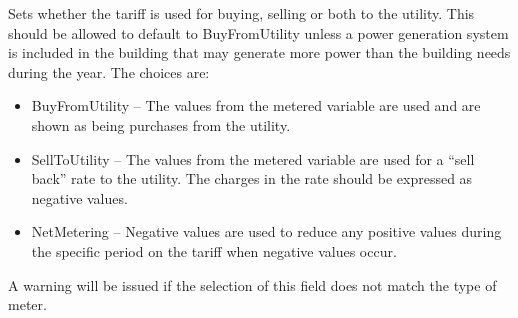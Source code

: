 Sets whether the tariff is used for buying, selling or both to the utility. This should be allowed to default to BuyFromUtility unless a power generation system is included in the building that may generate more power than the building needs during the year. The choices are:

\begin{itemize}
\item
  BuyFromUtility -- The values from the metered variable are used and are shown as being purchases from the utility.
\item
  SellToUtility -- The values from the metered variable are used for a ``sell back'' rate to the utility. The charges in the rate should be expressed as negative values.
\item
  NetMetering -- Negative values are used to reduce any positive values during the specific period on the tariff when negative values occur.
\end{itemize}

A warning will be issued if the selection of this field does not match the type of meter.
